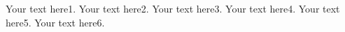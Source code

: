 \documentclass{article}
\begin{document}
Your text here1.
Your text here2.
Your text here3.
Your text here4.
Your text here5.
Your text here6.
\end{document}
